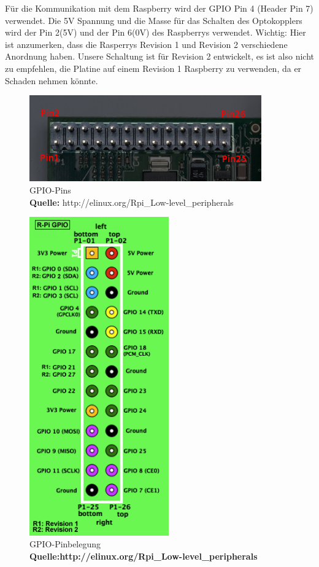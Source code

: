 Für die Kommunikation mit dem Raspberry wird der GPIO Pin 4 (Header Pin 7) verwendet. Die 5V Spannung und die Masse für das Schalten des Optokopplers wird der Pin 2(5V) und der Pin 6(0V) des Raspberrys verwendet. Wichtig: Hier ist anzumerken, dass die Rasperrys Revision 1 und Revision 2 verschiedene Anordnung haben. Unsere Schaltung ist für Revision 2 entwickelt, es ist also nicht zu empfehlen, die Platine auf einem Revision 1 Raspberry zu verwenden, da er Schaden nehmen könnte.
\\
\begin{figure}[H]
\centering
\includegraphics[keepaspectratio=true, width=10cm]{images/rpi/picPins.png}
\caption[GPIO-Pins]{GPIO-Pins\\ \textbf{Quelle:} http://elinux.org/Rpi\_Low-level\_peripherals}
\label{fig:report_hardware_gpio1}
\end{figure}
\begin{figure}[H]
\centering
\includegraphics[keepaspectratio=true, width=6cm]{images/rpi/gpio.png}
\caption[GPIO-Pinbelegung]{GPIO-Pinbelegung\\ \textbf{Quelle:http://elinux.org/Rpi\_Low-level\_peripherals}}
\label{fig:report_hardware_gpio2} 
\end{figure}
